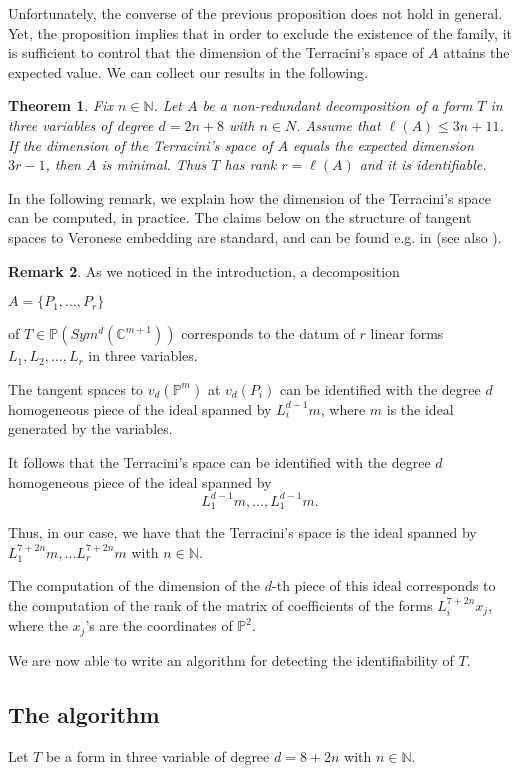 \documentclass[a4paper,10pt,oneside]{article}
\theoremstyle{casep}
\newcommand{\C}{\mathbb{C}}
\newcommand{\Pj}{\mathbb{P}}
\newcommand{\N}{\mathbb{N}}
\newtheorem{theorem}{Theorem}[section]
\theoremstyle{definition}
\newtheorem{remark}[theorem]{Remark}
\begin{document}
Unfortunately, the converse of the previous proposition does not hold in general.
Yet, the proposition implies that in order to exclude the existence of the family, it is sufficient to control that the dimension of the Terracini's space of $A$
attains the expected value. We can collect our results in the following.

\begin{theorem} Fix $ n \in \N $. Let $A$ be a non-redundant decomposition of a form $T$ in three variables of degree $d=2n+8$ with $ n \in N $. Assume that $\ell(A)\leq 3n+11$. If the dimension of the Terracini's space of $A$ equals the expected dimension $3r-1$,
then $A$ is minimal. Thus $T$ has rank $r=\ell(A)$ and it is identifiable.
\end{theorem}

In the following remark, we explain how the dimension of the Terracini's space can be computed, in practice. 
The claims below on the structure of tangent spaces to Veronese embedding
are standard, and can be found e.g. in \cite{ventitre} (see also \cite{sette}).

\begin{remark}
As we noticed in the introduction, a decomposition \begin{small} $A= \{ P_1, \dots ,P_r \}$ \end{small} of $T \in \Pj(Sym^d(\C^{m+1}))$ 
corresponds to the datum of $r$ linear forms $L_1,L_2, \dots, L_r$ in three variables. 

The tangent spaces to $v_d(\Pj^m)$ at $v_d(P_i)$ can be identified with the degree $d$ homogeneous piece of the ideal spanned by 
$ L^{d-1}_i m$, where $m$ is the ideal generated by the variables.

It follows that the Terracini's space can be identified with the degree $d$ homogeneous piece of the ideal spanned by 
$$ L^{d-1}_1 m, \dots ,L^{d-1}_1 m.$$ 

 Thus, in our case, we have that the Terracini's space is the ideal spanned by 
$L_1^{7+2n}m, \dots L_r^{7+2n}m$ with $ n \in \N $.

The computation of the dimension of the $d$-th piece of this ideal corresponds to the computation of the rank of the matrix of 
coefficients of the forms $L_i^{7+2n}x_j$, where the $x_j$'s are the coordinates of $\Pj^2$.
\end{remark}

We are now able to write an algorithm for detecting the identifiability of $T$.

\subsection{The algorithm}
\label{The algorithm}
Let $T$ be a form in three variable of degree $d=8+2n$ with $ n \in \N $.
\end{document}
